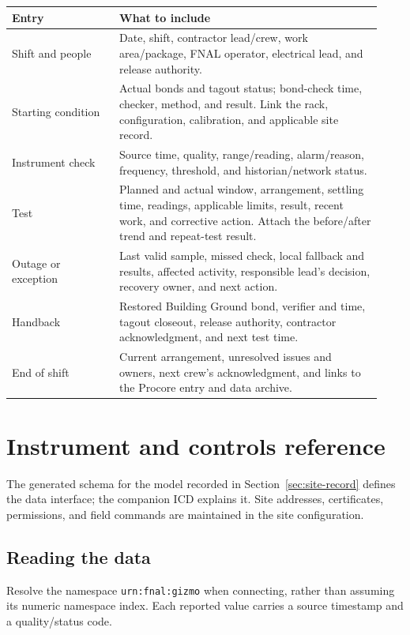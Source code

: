 \documentclass[11pt]{article}
\begin{document}
\begin{longtable}{@{}L{0.27\linewidth}L{0.66\linewidth}@{}}
\toprule
Entry & What to include \\
\midrule
\endhead
Shift and people & Date, shift, contractor lead/crew, work area/package, FNAL operator, electrical lead, and release authority. \\
Starting condition & Actual bonds and tagout status; bond-check time, checker, method, and result. Link the rack, configuration, calibration, and applicable site record. \\
Instrument check & Source time, quality, range/reading, alarm/reason, frequency, threshold, and historian/network status. \\
Test & Planned and actual window, arrangement, settling time, readings, applicable limits, result, recent work, and corrective action. Attach the before/after trend and repeat-test result. \\
Outage or exception & Last valid sample, missed check, local fallback and results, affected activity, responsible lead's decision, recovery owner, and next action. \\
Handback & Restored Building Ground bond, verifier and time, tagout closeout, release authority, contractor acknowledgment, and next test time. \\
End of shift & Current arrangement, unresolved issues and owners, next crew's acknowledgment, and links to the Procore entry and data archive. \\
\bottomrule
\end{longtable}

\appendix
\section{Instrument and controls reference}
\label{sec:controls-reference}

The generated schema for the model recorded in Section~\ref{sec:site-record} defines the data interface; the companion ICD explains it. Site addresses, certificates, permissions, and field commands are maintained in the site configuration.

\subsection{Reading the data}

Resolve the namespace \nolinkurl{urn:fnal:gizmo} when connecting, rather than assuming its numeric namespace index. Each reported value carries a source timestamp and a quality/status code.
\end{document}
